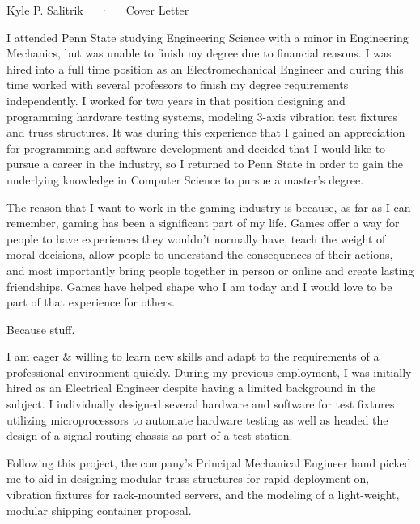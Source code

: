 \documentclass[12pt, a4paper]{awesome-cv}
\begin{document}
\makecvheader[C]

\makecvfooter
  {}
  {Kyle P. Salitrik~~~·~~~Cover Letter}
  {}

\makelettertitle

\begin{cvletter}

\quad I attended Penn State studying Engineering Science with a minor in Engineering Mechanics, but was unable to finish my degree due to financial reasons. I was hired into a full time position as an Electromechanical Engineer and during this time worked with several professors to finish my degree requirements independently. I worked for two years in that position designing and programming hardware testing systems, modeling 3-axis vibration test fixtures and truss structures. It was during this experience that I gained an appreciation for programming and software development and decided that I would like to pursue a career in the industry, so I returned to Penn State in order to gain the underlying knowledge in Computer Science to pursue a master's degree.

\quad The reason that I want to work in the gaming industry is because, as far as I can remember, gaming has been a significant part of my life. Games offer a way for people to have experiences they wouldn't normally have, teach the weight of moral decisions, allow people to understand the consequences of their actions, and most importantly bring people together in person or online and create lasting friendships. Games have helped shape who I am today and I would love to be part of that experience for others.

\quad Because stuff.



\quad I am eager \& willing to learn new skills and adapt to the requirements of a professional environment quickly. During my previous employment, I was initially hired as an Electrical Engineer despite having a limited background in the subject. I individually designed several hardware and software for test fixtures utilizing microprocessors to automate hardware testing as well as headed the design of a signal-routing chassis as part of a test station.

\quad Following this project, the company's Principal Mechanical Engineer hand picked me to aid in designing modular truss structures for rapid deployment on, vibration fixtures for rack-mounted servers, and the modeling of a light-weight, modular shipping container proposal.

\end{cvletter}


\makeletterclosing
\end{document}
